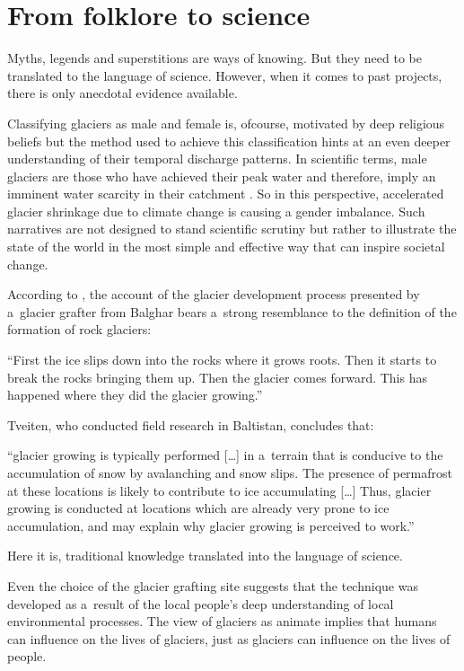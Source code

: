 \section{From folklore to science}

Myths, legends and superstitions are ways of knowing. But they need to be translated to the language of science.
However, when it comes to past projects, there is only anecdotal evidence available.

Classifying glaciers as male and female is, ofcourse, motivated by deep religious beliefs but the method used to
achieve this classification hints at an even deeper understanding of their temporal discharge patterns. In
scientific terms, male glaciers are those who have achieved their peak water and therefore, imply an imminent
water scarcity in their catchment \citet{}. So in this perspective, accelerated glacier shrinkage due to climate
change is causing a gender imbalance. Such narratives are not designed to stand scientific scrutiny but rather
to illustrate the state of the world in the most simple and effective way that can inspire societal change.

According to \citet{tveitenGlacierGrowingLocal2007}, the account of the glacier development process presented
by a glacier grafter from Balghar bears a strong resemblance to the definition of the formation of rock
glaciers: 

\begin{thesis_quotation}
“First the ice slips down into the rocks where it grows
roots. Then it starts to break the rocks bringing them up. Then the glacier comes forward. This has happened
where they did the glacier growing.” 
\end{thesis_quotation}

Tveiten, who conducted field research in Baltistan, concludes that: 

\begin{thesis_quotation}
“glacier growing is typically performed […] in a terrain that is conducive to the accumulation of snow by
avalanching and snow slips. The presence of permafrost at these locations is likely to contribute to ice
accumulating […] Thus, glacier growing is conducted at locations which are already very prone to ice
accumulation, and may explain why glacier growing is perceived to work.” 
\end{thesis_quotation}

Here it is, traditional knowledge translated into the language of science.

Even the choice of the glacier grafting site suggests that the technique was developed as a result of the local
people’s deep understanding of local environmental processes. The view of glaciers as animate implies that
humans can influence on the lives of glaciers, just as glaciers can influence on the lives of people.

